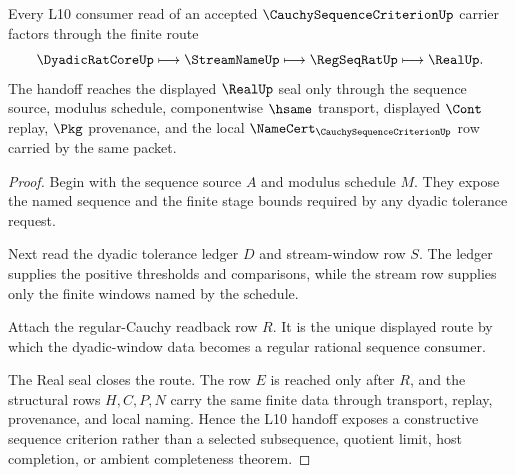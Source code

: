 \begin{theorem}
\label{thm:cauchy-sequence-criterion-l10-handoff}
Every L10 consumer read of an accepted $\CauchySequenceCriterionUp$ carrier factors through the finite route
$$
\DyadicRatCoreUp
\longmapsto
\StreamNameUp
\longmapsto
\RegSeqRatUp
\longmapsto
\RealUp .
$$
The handoff reaches the displayed $\RealUp$ seal only through the sequence source, modulus schedule, componentwise $\hsame$ transport, displayed $\Cont$ replay, $\Pkg$ provenance, and the local $\NameCert_{\CauchySequenceCriterionUp}$ row carried by the same packet.
\end{theorem}
\begin{proof}
Begin with the sequence source $A$ and modulus schedule $M$. They expose the named sequence and the finite stage bounds required by any dyadic tolerance request.

Next read the dyadic tolerance ledger $D$ and stream-window row $S$. The ledger supplies the positive thresholds and comparisons, while the stream row supplies only the finite windows named by the schedule.

Attach the regular-Cauchy readback row $R$. It is the unique displayed route by which the dyadic-window data becomes a regular rational sequence consumer.

The Real seal closes the route. The row $E$ is reached only after $R$, and the structural rows $H,C,P,N$ carry the same finite data through transport, replay, provenance, and local naming. Hence the L10 handoff exposes a constructive sequence criterion rather than a selected subsequence, quotient limit, host completion, or ambient completeness theorem.
\end{proof}


\begin{closurestatus}{\CauchySequenceCriterionUp}
  \theoryclosure{\seedClosure}
  \formalstatus{\unformalizedV}
\end{closurestatus}
